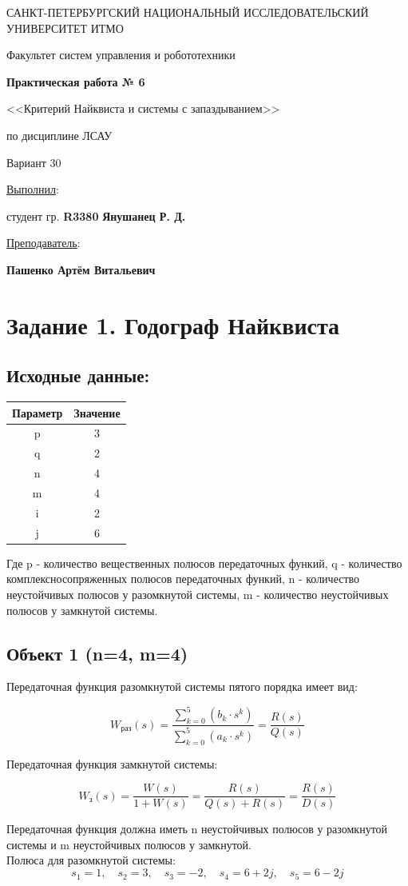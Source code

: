 \documentclass[a5paper, 10pt]{article}
\theoremstyle{definition}
\theoremstyle{plain}
\theoremstyle{remark}
\newcommand*{\titlePage}{
	\thispagestyle{title}
	\begingroup
	\begin{center}
		\vspace*{6ex}
		
		{\small
			САНКТ-ПЕТЕРБУРГСКИЙ НАЦИОНАЛЬНЫЙ ИССЛЕДОВАТЕЛЬСКИЙ УНИВЕРСИТЕТ ИТМО	
		}
		
		\vspace*{2ex}
		
		{\normalsize
			Факультет систем управления и робототехники
		}
		
		\vspace*{15ex}
		
		{\Large \bfseries 
			Практическая работа № 6
		}
\vspace*{2ex}
	{\Large \bfseries 
			
<<Критерий Найквиста и системы с запаздыванием>>
		}
\vspace*{2ex}
		
		{\normalsize
			по дисциплине ЛСАУ
		}
\vspace*{2ex}
	{\Large \bfseries 
			
Вариант 30
		}

	\end{center}
	\vspace*{8ex}
	\begin{flushright}
		{\large 
			\underline{Выполнил}:\\
			\begin{flushright}
				студент гр. \textbf{R3380} \textbf{Янушанец Р. Д.}\\
			\end{flushright}
		}
		
		\vspace*{6ex}
		
		{\large 
			\underline{Преподаватель}:\\
            \begin{flushright}
            \textbf{Пашенко Артём Витальевич}
            \end{flushright}
		}
	\end{flushright}
	\newpage
	\setcounter{page}{1}
	\endgroup}
\begin{document}
	\titlePage
	\pagestyle{style}
\newpage

\tableofcontents

\newpage


\section{Задание 1. Годограф Найквиста}

\subsection{Исходные данные:}
\begin{center}
\begin{tabular}{|c|c|}
\hline
     Параметр & Значение \\ \hline
     p&3\\ \hline
     q&2\\ \hline
     n&4\\ \hline
     m&4\\ \hline
     i&2\\ \hline
     j&6\\ \hline
\end{tabular}
\end{center}

Где p - количество вещественных полюсов передаточных функий, q - количество комплексносопряженных полюсов передаточных функий, n - количество неустойчивых полюсов у разомкнутой системы, m - количество неустойчивых полюсов у замкнутой системы.

\subsection{Объект 1 (n=4, m=4)}

Передаточная функция разомкнутой системы пятого порядка имеет вид:

$$
W_{\text{раз}}(s)=\dfrac{\sum \limits_{k=0}^{5}(b_k\cdot s^k)}{\sum \limits_{k=0}^{5}(a_k\cdot s^k)}=\dfrac{R(s)}{Q(s)}
$$

Передаточная функция замкнутой системы:

$$
W_{\text{з}}(s)=\dfrac{W(s)}{1+W(s)}=\dfrac{R(s)}{Q(s)+R(s)}=\dfrac{R(s)}{D(s)}
$$



Передаточная функция должна иметь n неустойчивых полюсов у разомкнутой системы и m неустойчивых полюсов у замкнутой.\\

Полюса для разомкнутой системы:
$$
s_1= 1,\quad s_2=3 ,\quad s_3=-2 ,\quad s_4=6+2j ,\quad s_5=6-2j
$$
\end{document}

